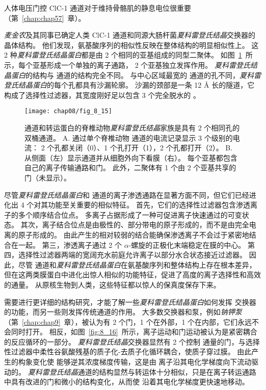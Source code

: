 人体电压门控 ClC-1 通道对于维持骨骼肌的静息电位很重要（第~\ref{chap:chap57}~章）。


\textit{麦金农}及其同事已确定人类 ClC-1 通道和同源大肠杆菌\textit{夏科雷登氏结晶}交换器的晶体结构。
他们发现，氨基酸序列的相似性反映在整体结构的明显相似性上。
这 2 种\textit{夏科雷登氏结晶蛋白}都是由 2 个相同的亚基组成的同型二聚体。
如图~\ref{fig:8_15}~所示，每个亚基形成一个单独的离子通路， 2 个亚基独立发挥作用。
\textit{夏科雷登氏结晶蛋白}的结构与  通道的结构完全不同。
与中心区域最宽的  通道的孔不同，\textit{夏科雷登氏结晶蛋白}的每个孔都具有沙漏轮廓。
沙漏的颈部是一条 12 Å 长的隧道，它构成了选择性过滤器，其宽度刚好足以包含 3 个完全脱水的 。


\begin{figure}[htbp]
	\centering
	\texttt{[image: chap08/fig\_8\_15]}
	\caption{ 通道和转运蛋白的脊椎动物\textit{夏科雷登氏结晶}家族是具有 2 个相同孔的双桶通道。
		A. 通过单个脊椎动物  通道的电流记录显示 3 个级别的电流：
		2 个孔都关闭（0）、1 个孔打开（1），2 个孔都打开（2）。
		B. 从侧面（左）显示通道并从细胞外向下看膜（右）。
		每个亚基都包含自己的离子传输通路和门。
		此外，二聚体有 1 个由 2 个亚基共享的门（未显示）。}
	\label{fig:8_15}
\end{figure}


尽管\textit{夏科雷登氏结晶蛋白}和  通道的离子渗透通路在显著方面不同，但它们已经进化出 4 个对其功能至关重要的相似特征。
首先，它们的选择性过滤器包含渗透离子的多个顺序结合位点。
多离子占据形成了一种可促进离子快速通过的可变状态。
其次，离子结合位点是由极性的、部分带电的原子形成的，而不是由完全电离的原子形成的。
由此产生的相对较弱的结合能确保渗透离子不会过于紧密地结合在一起。
第三，渗透离子通过 2 个 $\alpha$-螺旋的正极化末端稳定在膜的中心。
第四，选择性过滤器两端的宽阔充水前庭允许离子以部分水合状态接近过滤器。
因此，尽管  通道和\textit{夏科雷登氏结晶蛋白}在氨基酸序列和整体结构上存在根本差异，但在这两类膜蛋白中进化出惊人相似的功能特征，促进了高度的离子选择性和高效的通量。 
从原核生物到人类，这些特征都以惊人的保真度保存下来。


需要进行更详细的结构研究，才能了解一些\textit{夏科雷登氏结晶蛋白}如何发挥  交换器的功能，而另一些则发挥传统通道的作用。
大多数交换器和泵，例如\textit{钠钾泵}（第~\ref{chap:chap9}~章），被认为有 2 个门，1 个在外部，1 个在内部，它们永远不会同时打开。
相反，如图~\ref{fig:8_16}~所示，离子运动和门运动被认为是紧密耦合的反应循环的一部分。
\textit{夏科雷登氏结晶}交换器显然有 2 个控制  通量的门，与选择性过滤器中柔性谷氨酸残基的质子化-去质子化循环耦合，使质子穿过膜。
由此产生的构象变化使  能够逆其浓度梯度传输，这是由  离子沿其电化学梯度向下流动驱动的。
\textit{夏科雷登氏结晶}通道的结构显然与转运体十分相似，只是在离子转运通路中具有改进的门和微小的结构变化，从而使  沿着其电化学梯度更快速地移动。


